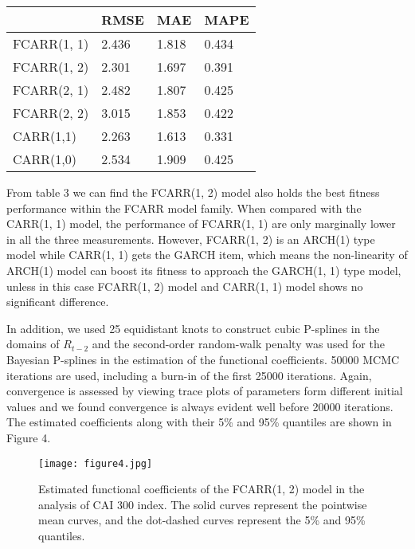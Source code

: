 \documentclass[
journal=jacsat, %
manuscript=article]{achemso}
\begin{document}
\begin{CJK*}{UTF8}{song}
\begin{table}[H]
\begin{center}
\begin{tabular}{L{0.3\textwidth}C{0.2\textwidth}C{0.2\textwidth}C{0.2\textwidth}}
\hline
            & RMSE & MAE & MAPE\\
\hline
FCARR(1, 1)	& 2.436	& 1.818 & 0.434\\
FCARR(1, 2)	& 2.301	& 1.697	& 0.391\\
FCARR(2, 1)	& 2.482	& 1.807	& 0.425\\
FCARR(2, 2)	& 3.015	& 1.853	& 0.422\\
CARR(1,1)	& 2.263	& 1.613	& 0.331\\
CARR(1,0)	& 2.534	& 1.909	& 0.425\\
\hline
\end{tabular}
\end{center}
\end{table}
From table 3 we can find the FCARR(1, 2) model also holds the best fitness performance within the FCARR model family. When compared with the CARR(1, 1) model, the performance of FCARR(1, 1) are only marginally lower in all the three measurements. However, FCARR(1, 2) is an ARCH(1) type model while CARR(1, 1) gets the GARCH item, which means the non-linearity of ARCH(1) model can boost its fitness to approach the GARCH(1, 1) type model, unless in this case FCARR(1, 2) model and CARR(1, 1) model shows no significant difference.

In addition, we used 25 equidistant knots to construct cubic P-splines in the domains of $R_{t-2}$ and the second-order random-walk penalty was used for the Bayesian P-splines in the estimation of the functional coefficients. 50000 MCMC iterations are used, including a burn-in of the first 25000 iterations. Again, convergence is assessed by viewing trace plots of parameters form different initial values and we found convergence is always evident well before 20000 iterations. The estimated coefficients along with their 5\% and 95\% quantiles are shown in Figure 4.
\begin{figure}[H]
\centering
\texttt{[image: figure4.jpg]}\\
\captionsetup{justification=raggedright, singlelinecheck=off}
\caption{Estimated functional coefficients of the FCARR(1, 2) model in the analysis of CAI 300 index. The solid curves represent the pointwise mean curves, and the dot-dashed curves represent the 5\% and 95\% quantiles.}
\end{figure}


\end{CJK*}
\end{document}
